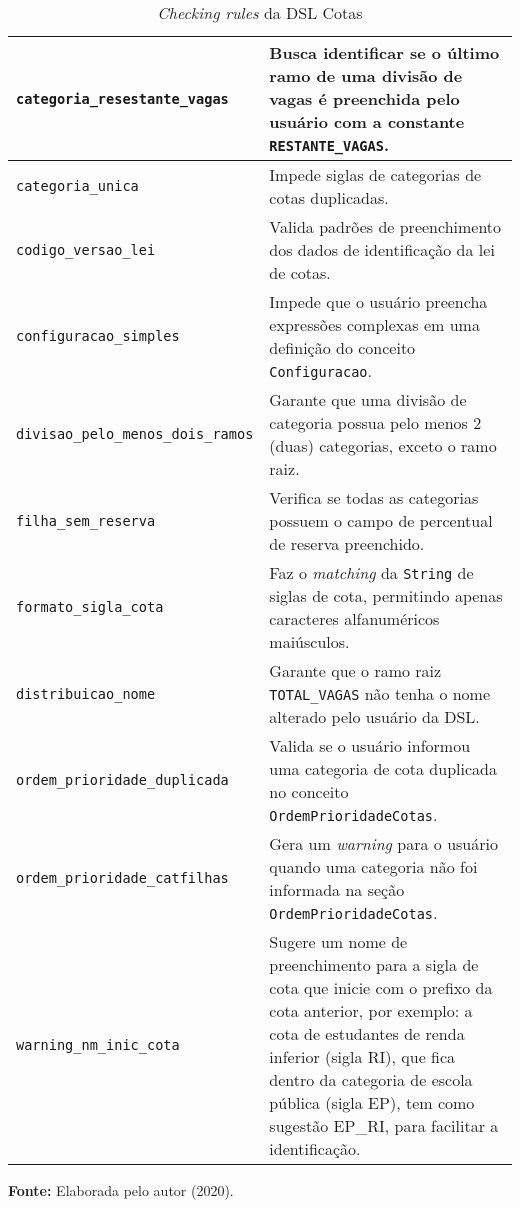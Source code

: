 \begin{table}[ht]
\caption{\textit{Checking rules} da DSL Cotas}
\label{tblcheckingrules}
\centering

\begin{tabular}{|p{6cm}|p{8cm}|}
\hline
\texttt{categoria\_resestante\_vagas} & Busca identificar se o último ramo de uma divisão de vagas é preenchida pelo usuário com a constante \texttt{RESTANTE\_VAGAS}.                                                                                      \\ \hline
\texttt{categoria\_unica} & Impede siglas de categorias de cotas duplicadas.                         \\ \hline
\texttt{codigo\_versao\_lei}          & Valida padrões de preenchimento dos dados de identificação da lei de cotas.                                       \\ \hline
\texttt{configuracao\_simples}          & Impede que o usuário preencha expressões complexas em uma definição do conceito \texttt{Configuracao}.
                        \\ \hline
\texttt{divisao\_pelo\_menos\_dois\_ramos}          & Garante que uma divisão de categoria possua pelo menos 2 (duas) categorias, exceto o ramo raiz.
                        \\ \hline
\texttt{filha\_sem\_reserva}          & Verifica se todas as categorias possuem o campo de percentual de reserva preenchido.

\\ \hline
               
\texttt{formato\_sigla\_cota}          & Faz o \textit{matching} da \texttt{String} de siglas de cota, permitindo apenas caracteres alfanuméricos maiúsculos.
\\ \hline

\texttt{distribuicao\_nome}          & Garante que o ramo raiz \texttt{TOTAL\_VAGAS} não tenha o nome alterado pelo usuário da DSL.
\\ \hline

\texttt{ordem\_prioridade\_duplicada}          & Valida se o usuário informou uma categoria de cota duplicada no conceito \texttt{OrdemPrioridadeCotas}.
\\ \hline

\texttt{ordem\_prioridade\_catfilhas}          & Gera um \textit{warning} para o usuário quando uma categoria não foi informada na seção \texttt{OrdemPrioridadeCotas}.
\\ \hline

\texttt{warning\_nm\_inic\_cota}          & Sugere um nome de preenchimento para a sigla de cota que inicie com o prefixo da cota anterior, por exemplo: a cota de estudantes de renda inferior (sigla RI), que fica dentro da categoria de escola pública (sigla EP), tem como sugestão EP\_RI, para facilitar a identificação.
\\ \hline

\end{tabular}

  \par\medskip\textbf{Fonte:} Elaborada pelo autor (2020). \par\medskip
\end{table}
